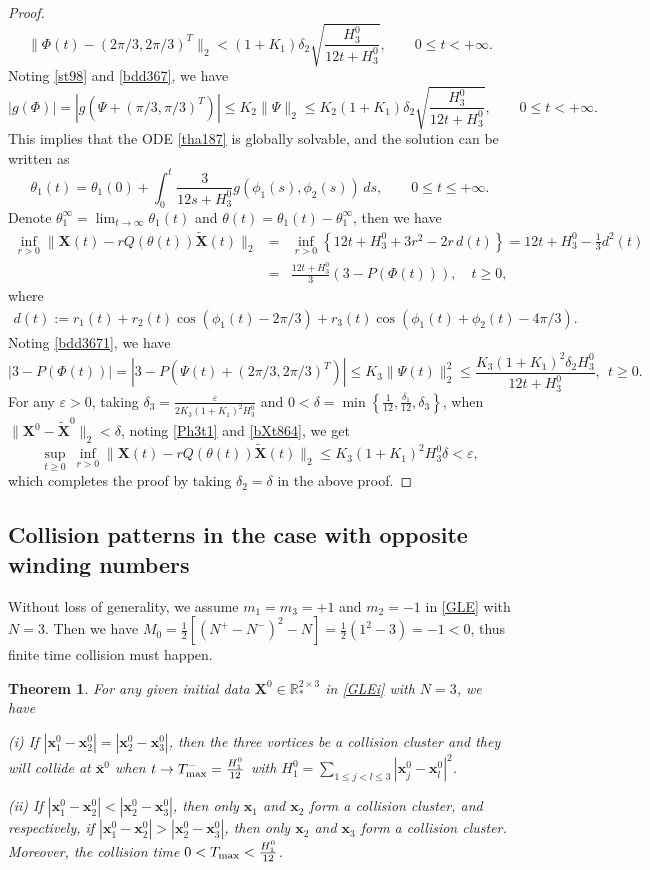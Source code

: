 \documentclass{aims}
\theoremstyle{plain}
\newtheorem{theorem}{Theorem}[section]
\theoremstyle{definition}
\newcommand{\bx}{{\mathbf x}}
\newcommand{\bX}{{\mathbf X}}
\newcommand{\nn}{\nonumber}
\newcommand{\be} {\begin{equation}}
\newcommand{\ee}{\end{equation}}
\newcommand{\bea}{\begin{eqnarray}}
\newcommand{\eea}{\end{eqnarray} }
\newcommand{\beas}{\begin{eqnarray*}}
\newcommand{\eeas}{\end{eqnarray*} }
\begin{document}
\begin{proof}
\begin{equation}
\|\Phi(t)-(2\pi/3,2\pi/3)^T\|_2<(1+K_1)\delta_2\sqrt{\frac{H_3^0}{12t+H_3^0}},
\qquad 0\leq t<+\infty.\nonumber
\end{equation}
Noting \eqref{st98} and \eqref{bdd367}, we have
\be%
|g(\Phi)|=|g(\Psi+(\pi/3,\pi/3)^T)|\leq K_2\|\Psi\|_2\le K_2(1+K_1)\delta_2\sqrt{\frac{H_3^0}{12t+H_3^0}},\qquad 0\leq t<+\infty.\nonumber
\ee
This implies that the ODE \eqref{tha187} is globally solvable, and the solution can be written as
\be
\theta_1(t)=\theta_1(0)+\int_0^t\frac{3}{12s+H_3^0}g(\phi_1(s), \phi_2(s))\,ds,\qquad 0\leq t\le +\infty.\nonumber
\ee
Denote $\theta_1^\infty=\lim_{t\to\infty}\theta_1(t)$ and
$\theta(t)=\theta_1(t)-\theta_1^\infty$, then we have
\bea\label{bXt864}
\inf_{r>0} \|\bX(t)-r Q(\theta(t))\tilde \bX(t)\|_2&=&
\inf_{r>0} \left\{12t+H_3^0+3r^2-2r\,d(t)\right\}
=12t+H_3^0-\frac{1}{3}d^2(t)\nn\\
&=&\frac{12t+H_3^0}{3}\left(3-P(\Phi(t))\right), \quad t\ge0,
\eea
where
\beas
d(t):=r_1(t)+r_2(t)\cos(\phi_1(t)-2\pi/3)+r_3(t)\cos(\phi_1(t)+\phi_2(t)-4\pi/3).
\eeas
Noting \eqref{bdd3671}, we have
\be\label{Ph3t1}
\left|3-P(\Phi(t))\right|=\left|3-P(\Psi(t)+(2\pi/3,2\pi/3)^T)\right|\leq K_3\|\Psi(t)\|_2^2\le \frac{K_3(1+K_1)^2\delta_2H_3^0}{12t+H_3^0},\ \ t\ge0.
\ee
For any $\varepsilon>0$, taking $\delta_3=\frac{\varepsilon}{2K_3(1+K_1)^2H_3^0}$ and
$0<\delta=\min\left\{\frac{1}{12},\frac{\delta_1}{12},\delta_3\right\}$,
 when $\|\bX^0-\tilde\bX^0\|_2< \delta$, noting \eqref{Ph3t1} and \eqref{bXt864}, we get
\be
\sup_{t\geq 0}\ \inf_{r>0} \|\bX(t)-r Q(\theta(t))\tilde \bX(t)\|_2
\leq K_3(1+K_1)^2H_3^0\delta< \varepsilon,\label{fin}
\ee
which completes the proof by taking $\delta_2=\delta$ in the above proof.
\end{proof}

\subsection{Collision patterns in the case with opposite winding numbers}
Without loss of generality, we assume $m_1=m_3=+1$ and $m_2=-1$ in
\eqref{GLE} with $N=3$. Then we have $M_0=\frac{1}{2}[(N^+-N^-)^2-N]=
\frac{1}{2}(1^2-3)=-1<0$, thus finite time collision must happen.

\begin{theorem} For any given initial data $\bX^0\in {\mathbb R}_*^{2\times 3}$ in \eqref{GLEi} with $N=3$,
we have

(i) If $|\mathbf
x_1^0-\mathbf x_2^0|=|\mathbf x_2^0-\mathbf x_3^0|$, then the three
vortices be a collision cluster and they will collide at $\bar\bx^0$ when
$t\to T_{\rm max}^-=\frac{H_1^0}{12}$ with $H_1^0=\sum_{1\leq j<l\leq 3}|\mathbf x_j^0-\mathbf
x_l^0|^2$.

(ii) If $|\mathbf x_1^0-\mathbf x_2^0|< |\mathbf
x_2^0-\mathbf x_3^0|$, then only $\mathbf x_1$ and $\mathbf x_2$ form
a collision cluster, and respectively, if $|\mathbf x_1^0-\mathbf x_2^0|> |\mathbf x_2^0-\mathbf x_3^0|$, then
only $\mathbf x_2$ and $\mathbf x_3$ form a collision cluster.
Moreover, the collision time $0<T_{\rm max}<\frac{H_1^0}{12}$.
\end{theorem}
\end{document}
